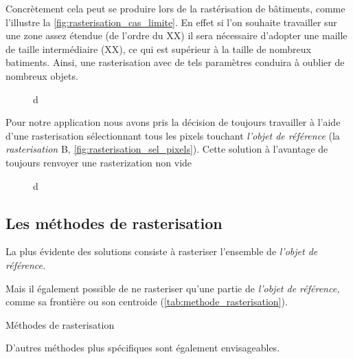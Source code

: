 Concrètement cela peut se produire lors de la rastérisation de bâtiments, comme l'illustre la \autoref{fig:rasterisation_cas_limite}. En effet si l'on souhaite travailler sur une zone assez étendue (de l'ordre du XX) il sera nécessaire d'adopter une maille de taille intermédiaire (XX), ce qui est supérieur à la taille de nombreux batiments. Ainsi, une rasterisation avec de tels paramètres conduira à oublier de nombreux objets.

\begin{figure}
  \centering
  
  \caption{d}
  \label{fig:rasterisation_sel_pixels}
\end{figure}
    
Pour notre application nous avons pris la décision de toujours travailler à l'aide d'une rasterisation sélectionnant tous les pixels touchant \emph{l'objet de référence} (\eg la \emph{rasterisation} \textcolor{RdBu-9-9}{\textsf{B}}, \autoref{fig:rasterisation_sel_pixels}). Cette solution à l’avantage de toujours renvoyer une rasterization non vide 

\begin{figure}
  \centering
  
  \caption{d}
  \label{fig:rasterisation_cas_limite}
\end{figure}

\subsection{Les méthodes de rasterisation}



La plus évidente des solutions consiste à rasteriser l'ensemble de
\emph{l'objet de référence.}


Mais il également possible de ne rasteriser qu'une partie de
\emph{l'objet de référence,} comme sa frontière ou son centroide
(\autoref{tab:methode_rasterisation}).

\begin{table}
  \centering
  
  \caption{Méthodes de rasterisation}
  \label{tab:methode_rasterisation}
\end{table}


D'autres méthodes plus spécifiques sont également envisageables.

